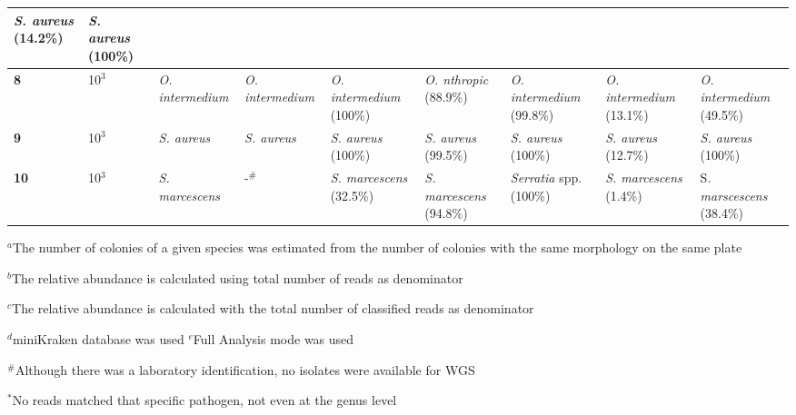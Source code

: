 \begin{table}[]
{\begin{tabular}{@{}|l|l|l|l|lllll|@{}}
  \multicolumn{1}{l|}{\textit{S. aureus} (14.2\%)} &
  \textit{S. aureus} (100\%) \\ \midrule
\textbf{8} &
  10$^3$ &
  \textit{O. intermedium} &
  \textit{O. intermedium} &
  \multicolumn{1}{l|}{\textit{O. intermedium} (100\%)} &
  \multicolumn{1}{l|}{\textit{O. nthropic} (88.9\%)} &
  \multicolumn{1}{l|}{\textit{O. intermedium} (99.8\%)} &
  \multicolumn{1}{l|}{\textit{O. intermedium} (13.1\%)} &
  \textit{O. intermedium} (49.5\%) \\ \midrule
\textbf{9} &
  10$^3$ &
  \textit{S. aureus} &
  \textit{S. aureus} &
  \multicolumn{1}{l|}{\textit{S. aureus} (100\%)} &
  \multicolumn{1}{l|}{\textit{S. aureus} (99.5\%)} &
  \multicolumn{1}{l|}{\textit{S. aureus} (100\%)} &
  \multicolumn{1}{l|}{\textit{S. aureus} (12.7\%)} &
  \textit{S. aureus} (100\%) \\ \midrule
\textbf{10} &
  10$^3$ &
  \textit{S. marcescens} &
  -$^\#$ &
  \multicolumn{1}{l|}{\textit{S. marcescens} (32.5\%)} &
  \multicolumn{1}{l|}{\textit{S. marcescens} (94.8\%)} &
  \multicolumn{1}{l|}{\textit{Serratia} spp. (100\%)} &
  \multicolumn{1}{l|}{\textit{S. marcescens} (1.4\%)} &
  S\textit{. marscescens} (38.4\%) \\ \bottomrule
\end{tabular}%
}
\small
\item $^a$The number of colonies of a given species was estimated from the number of colonies with the same morphology on the same plate 
\item $^b$The relative abundance is calculated using total number of reads as denominator
\item $^c$The relative abundance is calculated with the total number of classified reads as denominator
\item $^d$miniKraken database was used
\itel $^e$Full Analysis mode was used 
\item $^\#$Although there was a laboratory identification, no isolates were available for \ac{WGS}
\item $^*$No reads matched that specific pathogen, not even at the genus level
\end{table}
